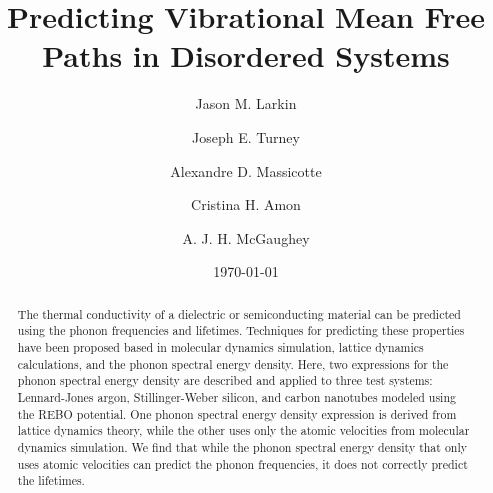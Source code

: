 \documentclass[aps,prb,preprint,superscriptaddress,amsmath,amssymb,floatfix]{revtex4}
\begin{document}
\title{Predicting Vibrational Mean Free Paths in Disordered Systems}

\author{Jason M. Larkin}
\author{Joseph E. Turney}
\author{Alexandre D. Massicotte}
\author{Cristina H. Amon}
\author{A. J. H. McGaughey}


\date{\today}

\begin{abstract}
The thermal conductivity of a dielectric or semiconducting material can be 
predicted using the phonon frequencies and lifetimes. Techniques for 
predicting these properties have been proposed based in molecular dynamics 
simulation, lattice dynamics calculations, and the phonon spectral energy 
density. Here, two expressions for the phonon spectral energy density are 
described and applied to three test systems: Lennard-Jones argon, 
Stillinger-Weber silicon, and carbon nanotubes modeled using the REBO 
potential. One phonon spectral energy density expression is derived from 
lattice dynamics theory, while the other uses only the atomic velocities 
from molecular dynamics simulation. We find that while the phonon spectral 
energy density that only uses atomic velocities can predict the phonon 
frequencies, it does not correctly predict the lifetimes.
\end{abstract}


\maketitle
\clearpage
\end{document}
